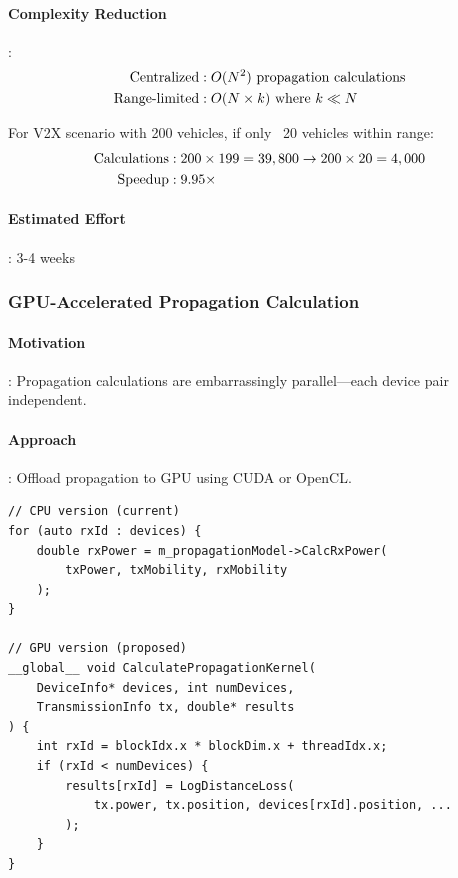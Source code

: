 \paragraph{Complexity Reduction}:
\begin{align}
\text{Centralized} &: O(N^2) \text{ propagation calculations} \notag \\
\text{Range-limited} &: O(N \times k) \text{ where } k \ll N \notag
\end{align}

For V2X scenario with 200 vehicles, if only ~20 vehicles within range:
\begin{align}
\text{Calculations} &: 200 \times 199 = 39,800 \rightarrow 200 \times 20 = 4,000 \notag \\
\text{Speedup} &: 9.95\times
\end{align}

\paragraph{Estimated Effort}: 3-4 weeks

\subsubsection{GPU-Accelerated Propagation Calculation}

\paragraph{Motivation}:
Propagation calculations are embarrassingly parallel—each device pair independent.

\paragraph{Approach}:
Offload propagation to GPU using CUDA or OpenCL.

\begin{lstlisting}[style=cpp]
// CPU version (current)
for (auto rxId : devices) {
    double rxPower = m_propagationModel->CalcRxPower(
        txPower, txMobility, rxMobility
    );
}

// GPU version (proposed)
__global__ void CalculatePropagationKernel(
    DeviceInfo* devices, int numDevices,
    TransmissionInfo tx, double* results
) {
    int rxId = blockIdx.x * blockDim.x + threadIdx.x;
    if (rxId < numDevices) {
        results[rxId] = LogDistanceLoss(
            tx.power, tx.position, devices[rxId].position, ...
        );
    }
}
\end{lstlisting}

